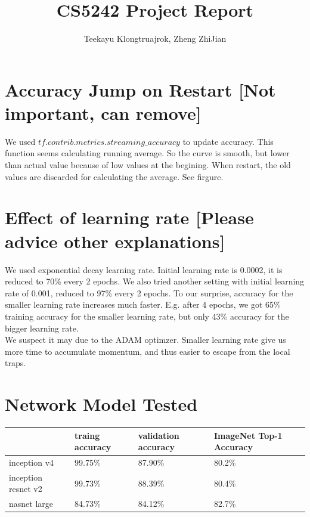 \documentclass[11pt]{article} %
\title{CS5242 Project Report}
\author{Teekayu Klongtruajrok, Zheng ZhiJian}
\date{} %
\begin{document}
\maketitle

\section{Accuracy Jump on Restart [Not important, can remove]}
We used $tf.contrib.metrics.streaming\_accuracy$ to update accuracy. This function seems calculating running average. So the curve is smooth, but lower than actual value because of low values at the begining. When restart, the old values are discarded for calculating the average. See firgure.

\section{Effect of learning rate [Please advice other explanations]}
We used exponential decay learning rate. Initial learning rate is 0.0002, it is reduced to 70\% every 2 epochs.
We also tried another setting with initial learning rate of 0.001, reduced to 97\% every 2 epochs. To our surprise, accuracy for the smaller learning rate increases much faster. E.g. after 4 epochs, we got 65\% training accuracy for the smaller learning rate, but only 43\% accuracy for the bigger learning rate.\\
We suspect it may due to the ADAM optimzer. Smaller learning rate give us more time to accumulate momentum, and thus easier to escape from the local traps.

\section{Network Model Tested}
\begin{tabular}{|l|l|l|l|}
	\hline
	& traing accuracy & validation accuracy & ImageNet Top-1 Accuracy\\ \hline
	inception v4 & 99.75\% & 87.90\% & 80.2\% \\ \hline
	inception resnet v2 & 99.73\% & 88.39\% & 80.4\% \\ \hline
	nasnet large & 84.73\% & 84.12\% & 82.7\% \\
	 \hline
\end{tabular}
\end{document}
